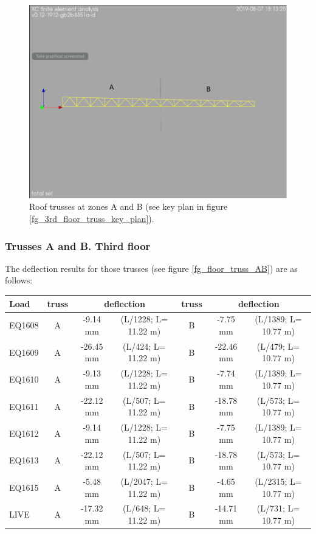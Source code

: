 \begin{figure}
  \begin{center}
  \includegraphics[width=120mm]{figures/trusses/roof_truss_AB}
  \end{center}
  \caption{Roof trusses at zones A and B (see key plan in figure \ref{fg_3rd_floor_truss_key_plan}).}\label{fg_roof_truss_AB}
\end{figure}

\subsubsection{Trusses A and B. Third floor}
The deflection results for those trusses (see figure \ref{fg_floor_truss_AB}) are as follows:

\begin{center}
  \begin{scriptsize}
  \begin{tabular}{|l|c|c|c|c|c|c|}
    \hline
    \textbf{Load} & \textbf{truss} & \multicolumn{2}{c|}{\textbf{deflection}} & \textbf{truss} & \multicolumn{2}{c|}{\textbf{deflection}} \\
    \hline
EQ1608 & A & -9.14 mm & (L/1228; L= 11.22 m)  & B & -7.75 mm & (L/1389; L= 10.77 m) \\
EQ1609 & A & -26.45 mm & (L/424; L= 11.22 m) & B & -22.46 mm & (L/479; L= 10.77 m) \\
EQ1610 & A & -9.13 mm & (L/1228; L= 11.22 m) & B & -7.74 mm & (L/1389; L= 10.77 m) \\
EQ1611 & A & -22.12 mm & (L/507; L= 11.22 m) & B & -18.78 mm & (L/573; L= 10.77 m) \\
EQ1612 & A & -9.14 mm & (L/1228; L= 11.22 m) & B & -7.75 mm & (L/1389; L= 10.77 m) \\
EQ1613 & A & -22.12 mm & (L/507; L= 11.22 m) & B & -18.78 mm & (L/573; L= 10.77 m) \\
EQ1615 & A & -5.48 mm & (L/2047; L= 11.22 m) & B & -4.65 mm & (L/2315; L= 10.77 m) \\
LIVE & A & -17.32 mm & (L/648; L= 11.22 m) & B & -14.71 mm & (L/731; L= 10.77 m) \\
\hline
  \end{tabular}
  \end{scriptsize}
\end{center}

